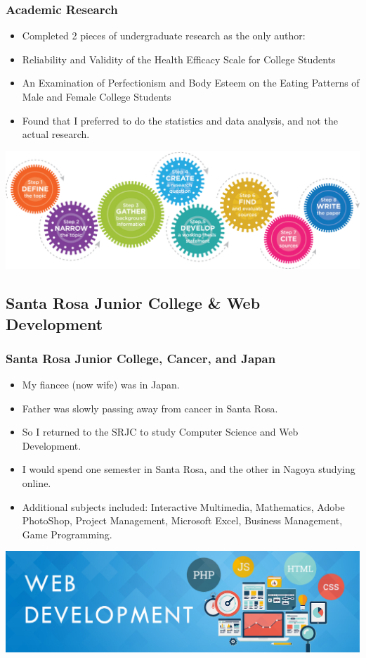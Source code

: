 \documentclass{beamer}
\begin{document}
		\begin{frame}
	\frametitle{Academic Research}
	\begin{itemize}
		\item Completed 2 pieces of undergraduate research as the only author:  
		\item Reliability and Validity of the Health Efficacy Scale for College Students
		\item An Examination of Perfectionism and Body Esteem on the Eating Patterns of Male and Female College Students
		\item Found that I preferred to do the statistics and data analysis, and not the actual research.  
	\end{itemize}
	\begin{center}
		\includegraphics[width = 1.0\textwidth]{images/Research-process.png}
	\end{center}
\end{frame}

		\subsection{Santa Rosa Junior College \& Web Development}
				\begin{frame}
			\frametitle{Santa Rosa Junior College, Cancer, and Japan}
	\begin{itemize}
		\item My fiancee (now wife) was in Japan. 
		\item Father was slowly passing away from cancer in Santa Rosa.
\item So I returned to the SRJC to study Computer Science and Web Development.
\item I would spend one semester in Santa Rosa, and the other in Nagoya studying online.
\item Additional subjects included:  Interactive Multimedia, Mathematics, Adobe PhotoShop, Project Management, Microsoft Excel, Business Management, Game Programming.
\end{itemize}
\begin{center}
	\includegraphics[width = 1.0\textwidth]{images/web dev.png}
\end{center}
\end{frame}
\end{document}

